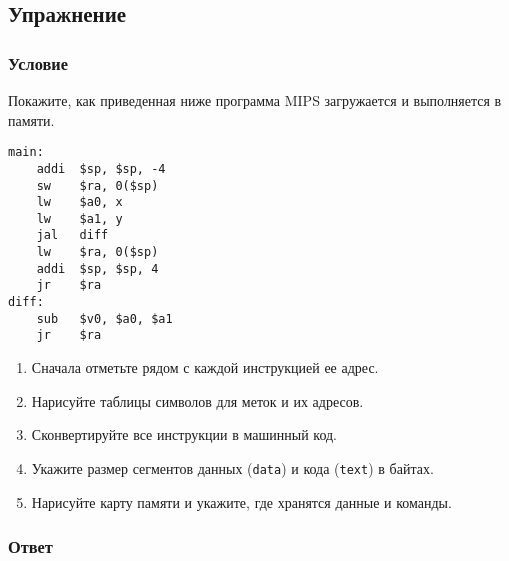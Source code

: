 \documentclass[12pt]{article}
\newenvironment{e}[1][dummy label]{
    \subsection{Упражнение}\label{#1}
    \subsubsection*{Условие}
    }{
    \subsubsection*{Ответ}
}
\begin{document}
    \begin{e}[e:mips]
        Покажите, как приведенная ниже программа MIPS загружается и выполняется в памяти.
        \begin{verbatim}
main:
    addi  $sp, $sp, -4
    sw    $ra, 0($sp)
    lw    $a0, x
    lw    $a1, y
    jal   diff
    lw    $ra, 0($sp)
    addi  $sp, $sp, 4
    jr    $ra
diff:
    sub   $v0, $a0, $a1
    jr    $ra
        \end{verbatim}

        \begin{enumerate}
            \item Сначала отметьте рядом с каждой инструкцией ее адрес.
            \item Нарисуйте таблицы символов для меток и их адресов.
            \item Сконвертируйте все инструкции в машинный код.
            \item Укажите размер сегментов данных (\texttt{data}) и кода (\texttt{text}) в байтах.
            \item Нарисуйте карту памяти и укажите, где хранятся данные и команды.
        \end{enumerate}
    \end{e}
\end{document}
